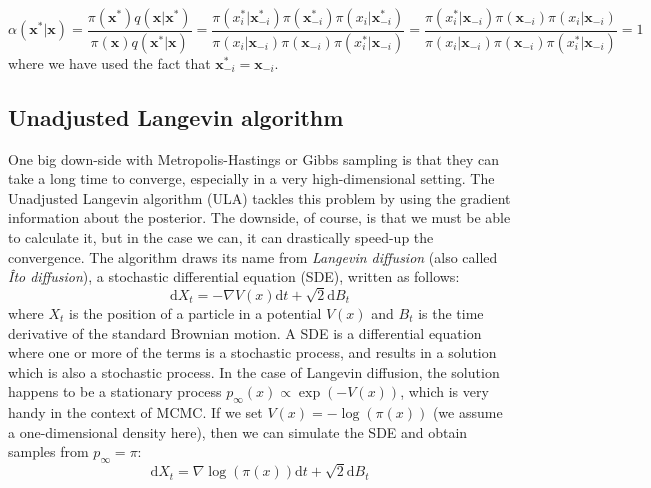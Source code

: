 \documentclass[12pt]{memoir}
\newcommand{\mb}{\mathbf}
\newcommand{\ti}{\textit}
\begin{document}
\begin{equation}
    \alpha(\mb x^*|\mb x) = \frac{\pi(\mb x^*) q(\mb x|\mb x^*)}{\pi(\mb x) q(\mb x^* |\mb x)} = \frac{\pi(x_i^*|\mb x_{-i}^*)\pi(\mb x^*_{-i}) \pi(x_i|\mb x^*_{-i})}{\pi(x_i|\mb x_{-i})\pi(\mb x_{-i}) \pi(x_i^*|\mb x_{-i})} = \frac{\pi( x_i^*|\mb x_{-i})\pi(\mb x_{-i}) \pi(x_i|\mb x_{-i})}{\pi(x_i|\mb x_{-i})\pi(\mb x_{-i}) \pi(x_i^*|\mb x_{-i})} = 1
\end{equation}
where we have used the fact that $\mb x^*_{-i} = \mb x_{-i}$.


\subsection{Unadjusted Langevin algorithm}\label{section:ula}
One big down-side with Metropolis-Hastings or Gibbs sampling is that they can take a long time to converge, especially in a very high-dimensional setting. The Unadjusted Langevin algorithm (ULA) tackles this problem by using the gradient information about the posterior. The downside, of course, is that we must be able to calculate it, but in the case we can, it can drastically speed-up the convergence. The algorithm draws its name from \ti{Langevin diffusion} (also called \ti{Îto diffusion}), a stochastic differential equation (SDE), written as follows:
\begin{equation}
    \mathrm{d}X_t = -\nabla V(x)\mathrm{d}t + \sqrt{2}\mathrm{d}B_t
\end{equation}
where $X_t$ is the position of a particle in a potential $V(x)$ and $B_t$ is the time derivative of the standard Brownian motion. A SDE is a differential equation where one or more of the terms is a stochastic process, and results in a solution which is also a stochastic process. In the case of Langevin diffusion, the solution happens to be a stationary process $p_{\infty}(x) \propto \exp(-V(x))$, which is very handy in the context of MCMC. If we set $V(x) = -\log(\pi(x))$ (we assume a one-dimensional density here), then we can simulate the SDE and obtain samples from $p_\infty = \pi$:
\begin{equation}    
    \mathrm{d}X_t = \nabla \log(\pi(x))\mathrm{d}t + \sqrt{2}\mathrm{d}B_t
\end{equation}
\end{document}
